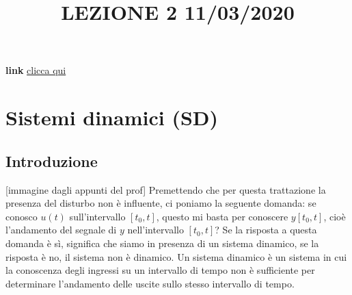 \newpage
\title{LEZIONE 2 11/03/2020}\newline
\textbf{link} \href{https://web.microsoftstream.com/video/c3fbadab-4a18-4fbd-bd5c-3a50914235b4?list=user&userId=faa91214-a6f5-40d7-8875-253fd49b8ce1}{clicca qui}
\section{Sistemi dinamici (SD)} 
\subsection{Introduzione}
[immagine dagli appunti del prof]\newline
Premettendo che per questa trattazione la presenza del disturbo non è influente, ci poniamo la seguente domanda: se conosco $u(t)$ sull'intervallo $[t_0, t]$, questo mi basta per conoscere $y[t_0,t]$, cioè l'andamento del segnale di $y$ nell'intervallo $[t_0,t]$?\newline
Se la risposta a questa domanda è sì, significa che siamo in presenza di un sistema dinamico, se la risposta è no, il sistema non è dinamico.\newline
\newline
Un sistema dinamico è un sistema in cui la conoscenza degli ingressi su un intervallo di tempo non è sufficiente per determinare l'andamento delle uscite sullo stesso intervallo di tempo.
